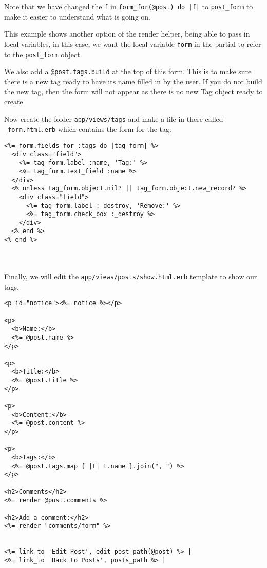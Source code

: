 \documentclass[10pt]{book}
\begin{document}
Note that we have changed the \texttt{f} in \texttt{form\_for(@post) do |f|} to \texttt{post\_form} to make it easier to understand what is going on.

This example shows another option of the render helper, being able to pass in local variables, in this case, we want the local variable \texttt{form} in the partial to refer to the \texttt{post\_form} object.

We also add a \texttt{@post.tags.build} at the top of this form. This is to make sure there is a new tag ready to have its name filled in by the user. If you do not build the new tag, then the form will not appear as there is no new Tag object ready to create.

Now create the folder \texttt{app/views/tags} and make a file in there called \texttt{\_form.html.erb} which contains the form for the tag:

\begin{minipage}{\textwidth}
\begin{verbatim}
<%= form.fields_for :tags do |tag_form| %>
  <div class="field">
    <%= tag_form.label :name, 'Tag:' %>
    <%= tag_form.text_field :name %>
  </div>
  <% unless tag_form.object.nil? || tag_form.object.new_record? %>
    <div class="field">
      <%= tag_form.label :_destroy, 'Remove:' %>
      <%= tag_form.check_box :_destroy %>
    </div>
  <% end %>
<% end %>
\end{verbatim}
\end{minipage}
\\ \\

Finally, we will edit the \texttt{app/views/posts/show.html.erb} template to show our tags.


\begin{verbatim}
<p id="notice"><%= notice %></p>
 
<p>
  <b>Name:</b>
  <%= @post.name %>
</p>
 
<p>
  <b>Title:</b>
  <%= @post.title %>
</p>
 
<p>
  <b>Content:</b>
  <%= @post.content %>
</p>
 
<p>
  <b>Tags:</b>
  <%= @post.tags.map { |t| t.name }.join(", ") %>
</p>
 
<h2>Comments</h2>
<%= render @post.comments %>
 
<h2>Add a comment:</h2>
<%= render "comments/form" %>
 
 
<%= link_to 'Edit Post', edit_post_path(@post) %> |
<%= link_to 'Back to Posts', posts_path %> |
\end{verbatim}
\end{document}
